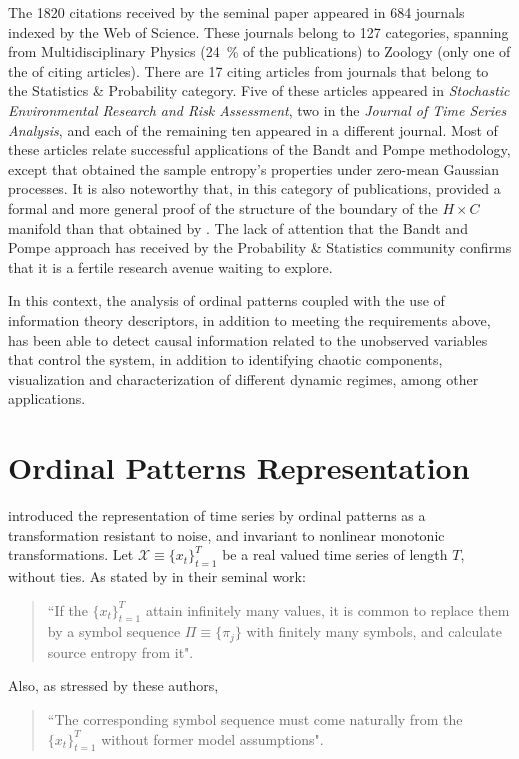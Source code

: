 The \num{1820} citations received by the seminal paper appeared in \num{684} journals indexed by the Web of Science.
These journals belong to \num{127} categories, spanning from Multidisciplinary Physics (\SI{24}{\percent} of the publications) to Zoology (only one of the of citing articles).
There are \num{17} citing articles from journals that belong to the Statistics \& Probability category.
Five of these articles appeared in \textit{Stochastic Environmental Research and Risk Assessment}, 
two in the \textit{Journal of Time Series Analysis}, 
and each of the remaining ten appeared in a different journal.
Most of these articles relate successful applications of the Bandt and Pompe methodology, except \cite{OrdinalPatternProbabilities} that obtained the sample entropy's properties under zero-mean Gaussian processes.
It is also noteworthy that, in this category of publications, \cite{DistributionsofOrderPatternsofIntervalMaps} provided a formal and more general proof of the structure of the boundary of the $H\times C$ manifold than that obtained by \cite{martin2006generalized}.
The lack of attention that the Bandt and Pompe approach has received by the Probability \& Statistics community confirms that it is a fertile research avenue waiting to explore.

In this context, the analysis of ordinal patterns coupled with the use of information theory descriptors, in addition to meeting the requirements above, has been able to detect causal information related to the unobserved variables that control the system, in addition to identifying chaotic components, visualization and characterization of different dynamic regimes, among other applications.

\section{Ordinal Patterns Representation}\label{sub:ordinalPatterns}

\cite{Bandt2002Permutation} introduced the representation of time series by ordinal patterns as a transformation resistant to noise, and invariant to nonlinear monotonic transformations.
Let ${\mathcal X} \equiv \{x_t\}_{t=1}^{T}$ be a real valued time series of length $T$, without ties. 
As stated by \cite{Bandt2002Permutation} in their seminal work:  
\begin{quote}
``If the $\{x_t\}_{t=1}^{T}$ attain infinitely many values, it is common to replace them by a symbol sequence 
$\Pi \equiv \{\pi_j\}$ with finitely many symbols, and calculate source entropy from it".
\end{quote}
Also, as stressed by these authors, 
\begin{quote}
``The corresponding symbol sequence must come 
naturally from the $\{x_t\}_{t=1}^{T}$ without former model assumptions".
\end{quote}

